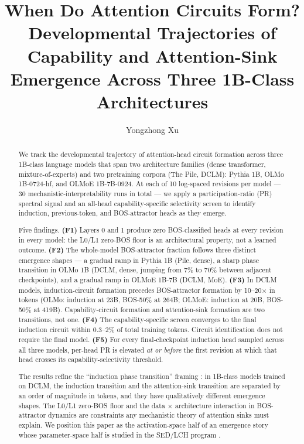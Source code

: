 \documentclass[11pt]{article}
\title{\textbf{When Do Attention Circuits Form?\\
Developmental Trajectories of Capability and Attention-Sink
Emergence Across Three 1B-Class Architectures}}
\author{Yongzhong Xu}
\date{}
\begin{document}
\maketitle

\begin{abstract}
\noindent
We track the developmental trajectory of attention-head circuit formation
across three 1B-class language models that span two architecture families
(dense transformer, mixture-of-experts) and two pretraining corpora
(The Pile, DCLM): Pythia 1B, OLMo 1B-0724-hf, and OLMoE 1B-7B-0924. At
each of 10 log-spaced revisions per model --- 30 mechanistic-interpretability
runs in total --- we apply a participation-ratio (PR) spectral signal and an
all-head capability-specific selectivity screen to identify induction,
previous-token, and BOS-attractor heads as they emerge.

Five findings. \textbf{(F1)} Layers 0 and 1 produce zero BOS-classified heads
at every revision in every model: the L0/L1 zero-BOS floor is an architectural
property, not a learned outcome. \textbf{(F2)} The whole-model BOS-attractor
fraction follows three distinct emergence shapes --- a gradual ramp in Pythia
1B (Pile, dense), a sharp phase transition in OLMo 1B (DCLM, dense, jumping
from 7\% to 70\% between adjacent checkpoints), and a gradual ramp in OLMoE
1B-7B (DCLM, MoE). \textbf{(F3)} In DCLM models, induction-circuit formation
precedes BOS-attractor formation by 10--20$\times$ in tokens (OLMo: induction
at 23B, BOS-50\% at 264B; OLMoE: induction at 20B, BOS-50\% at 419B).
Capability-circuit formation and attention-sink formation are two transitions,
not one. \textbf{(F4)} The capability-specific screen converges to the final
induction circuit within 0.3--2\% of total training tokens. Circuit
identification does not require the final model. \textbf{(F5)} For every
final-checkpoint induction head sampled across all three models, per-head PR
is elevated \emph{at or before} the first revision at which that head crosses
its capability-selectivity threshold.

The results refine the ``induction phase transition'' framing
\citep{olsson2022}: in 1B-class models trained on DCLM, the induction
transition and the attention-sink transition are separated by an order of
magnitude in tokens, and they have qualitatively different emergence shapes.
The L0/L1 zero-BOS floor and the data $\times$ architecture interaction in
BOS-attractor dynamics are constraints any mechanistic theory of attention
sinks must explain. We position this paper as the activation-space half of
an emergence story whose parameter-space half is studied in the SED/LCH
program \citep{xu2026sed,xu2026lch}.
\end{abstract}
\end{document}

